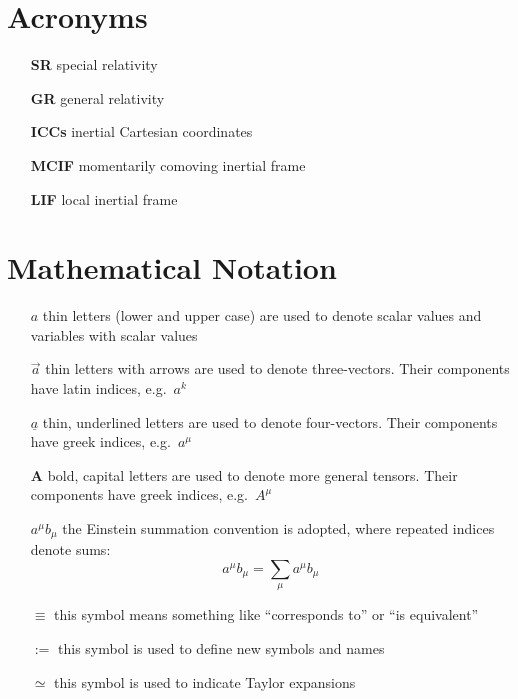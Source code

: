 \newpage

\fi



\section*{Acronyms}

\begin{itemize}
	\item[\textbf{SR}] special relativity

	\item[\textbf{GR}] general relativity
	
	\item[\textbf{ICCs}] inertial Cartesian coordinates
	
	\item[\textbf{MCIF}] momentarily comoving inertial frame
	
	\item[\textbf{LIF}] local inertial frame
\end{itemize}



\section*{Mathematical Notation}

\begin{itemize}
	\item[$a$] thin letters (lower and upper case) are used to denote scalar values and variables with scalar values
	
	\item[$\vec{a}$] thin letters with arrows are used to denote three-vectors. Their components have latin indices, e.g.~$a^k$
	
	\item[$\underline{a}$] thin, underlined letters are used to denote four-vectors. Their components have greek indices, e.g.~$a^\mu$
	
	\item[$\mathbf{A}$] bold, capital letters are used to denote more general tensors. Their components have greek indices, e.g.~$A^\mu$
	
	\item[$a^\mu b_\mu$] the Einstein summation convention is adopted, where repeated indices denote sums: $$a^\mu b_\mu = \sum_\mu a^\mu b_\mu$$
	
	\item[$\equiv$] this symbol means something like \enquote{corresponds to} or \enquote{is equivalent}

	\item[$:=$] this symbol is used to define new symbols and names

	\item[$\simeq$] this symbol is used to indicate Taylor expansions
\end{itemize}



